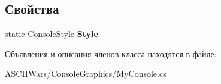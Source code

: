 \subsection*{Свойства}
\begin{DoxyCompactItemize}
\item 
\hypertarget{class_a_s_c_i_i_wars_1_1_console_graphics_1_1_my_console_a2a25ec7c9c245a9a479453f71bd30c2d}{}\label{class_a_s_c_i_i_wars_1_1_console_graphics_1_1_my_console_a2a25ec7c9c245a9a479453f71bd30c2d} 
static Console\+Style {\bfseries Style}
\end{DoxyCompactItemize}


Объявления и описания членов класса находятся в файле\+:\begin{DoxyCompactItemize}
\item 
A\+S\+C\+I\+I\+Wars/\+Console\+Graphics/My\+Console.\+cs\end{DoxyCompactItemize}
